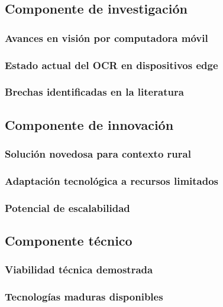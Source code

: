 \subsection{Componente de investigación}

\subsubsection{Avances en visión por computadora móvil}

\subsubsection{Estado actual del OCR en dispositivos edge}

\subsubsection{Brechas identificadas en la literatura}

\subsection{Componente de innovación}

\subsubsection{Solución novedosa para contexto rural}

\subsubsection{Adaptación tecnológica a recursos limitados}

\subsubsection{Potencial de escalabilidad}

\subsection{Componente técnico}

\subsubsection{Viabilidad técnica demostrada}

\subsubsection{Tecnologías maduras disponibles}

